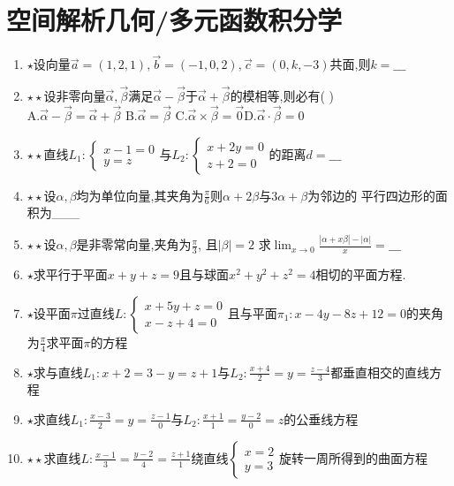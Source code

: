 \documentclass[12pt, a4paper, oneside, UTF8]{ctexbook}
\begin{document}
\section{空间解析几何/多元函数积分学}
\begin{enumerate}
    \item $\star$设向量$\vec{a}=(1,2,1),\vec{b}=(-1,0,2),\vec{c}=(0,k,-3)$共面,则$k=\_\_\_$ 
    
    \item $\star\star$设非零向量$\vec{\alpha},\vec{\beta}$满足$\vec{\alpha}-\vec{\beta}$于$\vec{\alpha}+\vec{\beta}$的模相等,则必有(  ) \\
    A.$\vec{\alpha}-\vec{\beta}=\vec{\alpha}+\vec{\beta}$ \qquad B.$\vec{\alpha}=\vec{\beta}$ \qquad
    C.$\vec{\alpha}\times\vec{\beta}=\vec{0}$\qquad D.$\vec{\alpha}\cdot\vec{\beta}=0$

    \item $\star\star$直线$L_1:\begin{cases}
        x - 1 = 0 \\
        y = z
    \end{cases}$与$L_2:\begin{cases}
        x+2y = 0 \\
        z + 2 = 0
    \end{cases}$的距离$d=\_\_\_$

    \item $\star\star$设$\alpha,\beta$均为单位向量,其夹角为$\displaystyle \frac{\pi}{6}$则$\alpha+2\beta$与$3\alpha+\beta$为邻边的
    平行四边形的面积为\_\_\_ 

    \item $\star\star$设$\alpha,\beta$是非零常向量,夹角为$\displaystyle \frac{\pi}{3}$, 且$\left|\beta\right|=2$
    求$\displaystyle \lim_{x\to 0}\frac{\left|\alpha+x\beta\right|-\left|\alpha\right|}{x}=\_\_\_$

    \item $\star$求平行于平面$x+y+z=9$且与球面$x^2+y^2+z^2=4$相切的平面方程. 
    
    \item $\star$设平面$\pi$过直线$L:\begin{cases}
        x + 5y + z = 0 \\
        x - z + 4 = 0
    \end{cases}$且与平面$\pi_1:x-4y-8z+12=0$的夹角为$\displaystyle\frac{\pi}{4}$求平面$\pi$的方程

    \item $\star$求与直线$L_1:x+2=3-y=z+1$与$L_2:\displaystyle \frac{x+4}{2}=y=\frac{z-4}{3}$都垂直相交的直线方程
    
    \item $\star$求直线$L_1:\displaystyle\frac{x-3}{2}=y=\frac{z-1}{0}$与$L_2:\displaystyle \frac{x+1}{1}=\frac{y-2}{0}=z$的公垂线方程
    
    \item $\star\star$求直线$L:\displaystyle \frac{x-1}{3}=\frac{y-2}{4}=\frac{z+1}{1}$绕直线$\begin{cases}
        x = 2\\
        y = 3
    \end{cases}$旋转一周所得到的曲面方程


\end{enumerate}
\end{document}
